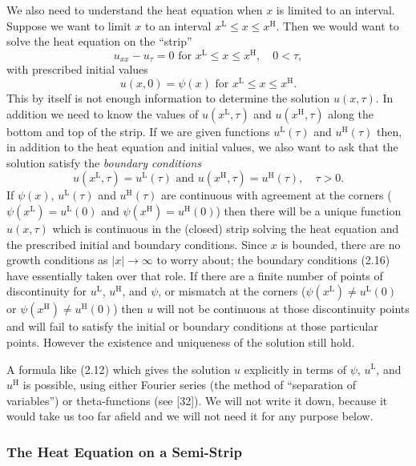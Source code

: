 We also need to understand the heat equation when \(x\) is limited to an interval. Suppose we want to limit \(x\) to an interval \(x^{\mathrm{L}} \leq x \leq x^{\mathrm{H}}\). Then we would want to solve the heat equation on the ``strip''
\[
u_{xx} - u_{\tau} = 0 \text{ for } x^{\mathrm{L}} \leq x \leq x^{\mathrm{H}}, \quad 0 < \tau,
\]
with prescribed initial values
\[
u(x,0) = \psi(x) \text{ for } x^{\mathrm{L}} \leq x \leq x^{\mathrm{H}}.
\]
This by itself is not enough information to determine the solution \(u(x,\tau)\). In addition we need to know the values of \(u(x^{\mathrm{L}},\tau)\) and \(u(x^{\mathrm{H}},\tau)\) along the bottom and top of the strip. If we are given functions \(u^{\mathrm{L}}(\tau)\) and \(u^{\mathrm{H}}(\tau)\) then, in addition to the heat equation and initial values, we also want to ask that the solution satisfy the \textit{boundary conditions}
\[
u(x^{\mathrm{L}},\tau) = u^{\mathrm{L}}(\tau) \text{ and } u(x^{\mathrm{H}},\tau) = u^{\mathrm{H}}(\tau), \quad \tau > 0. \tag{2.16}
\]
If \(\psi(x)\), \(u^{\mathrm{L}}(\tau)\) and \(u^{\mathrm{H}}(\tau)\) are continuous with agreement at the corners (\(\psi(x^{\mathrm{L}}) = u^{\mathrm{L}}(0)\) and \(\psi(x^{\mathrm{H}}) = u^{\mathrm{H}}(0)\)) then there will be a unique function \(u(x,\tau)\) which is continuous in the (closed) strip solving the heat equation and the prescribed initial and boundary conditions. Since \(x\) is bounded, there are no growth conditions as \(|x| \to \infty\) to worry about; the boundary conditions (2.16) have essentially taken over that role. If there are a finite number of points of discontinuity for \(u^{\mathrm{L}}\), \(u^{\mathrm{H}}\), and \(\psi\), or mismatch at the corners (\(\psi(x^{\mathrm{L}}) \neq u^{\mathrm{L}}(0)\) or \(\psi(x^{\mathrm{H}}) \neq u^{\mathrm{H}}(0)\)) then \(u\) will not be continuous at those discontinuity points and will fail to satisfy the initial or boundary conditions at those particular points. However the existence and uniqueness of the solution still hold.

A formula like (2.12) which gives the solution \(u\) explicitly in terms of \(\psi\), \(u^{\mathrm{L}}\), and \(u^{\mathrm{H}}\) is possible, using either Fourier series (the method of ``separation of variables'') or theta-functions (see [32]). We will not write it down, because it would take us too far afield and we will not need it for any purpose below.

\subsubsection{The Heat Equation on a Semi-Strip}

